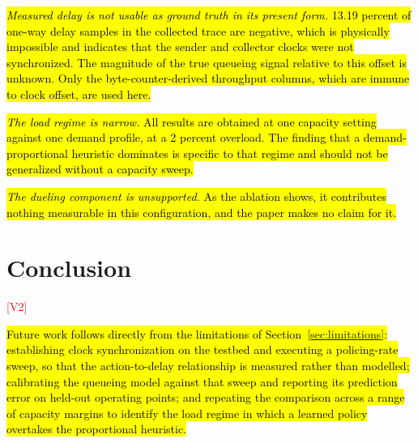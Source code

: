\documentclass[conference]{IEEEtran}
\newcommand{\rev}[1]{\hl{#1}}
\begin{document}
\rev{\emph{Measured delay is not usable as ground truth in its present form.} 13.19 percent of one-way delay samples in the collected trace are negative, which is physically impossible and indicates that the sender and collector clocks were not synchronized. The magnitude of the true queueing signal relative to this offset is unknown. Only the byte-counter-derived throughput columns, which are immune to clock offset, are used here.}

\rev{\emph{The load regime is narrow.} All results are obtained at one capacity setting against one demand profile, at a 2 percent overload. The finding that a demand-proportional heuristic dominates is specific to that regime and should not be generalized without a capacity sweep.}

\rev{\emph{The dueling component is unsupported.} As the ablation shows, it contributes nothing measurable in this configuration, and the paper makes no claim for it.}

\section{Conclusion}\label{sec:conclusion}

\textcolor{red}{[V2]}

\rev{Future work follows directly from the limitations of Section~\ref{sec:limitations}: establishing clock synchronization on the testbed and executing a policing-rate sweep, so that the action-to-delay relationship is measured rather than modelled; calibrating the queueing model against that sweep and reporting its prediction error on held-out operating points; and repeating the comparison across a range of capacity margins to identify the load regime in which a learned policy overtakes the proportional heuristic.}
\end{document}
